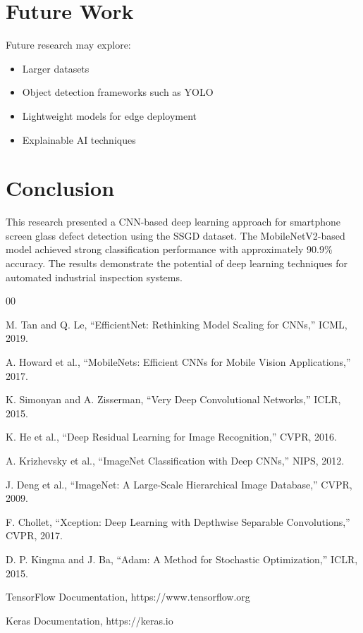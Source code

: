 \documentclass[conference]{IEEEtran}
\begin{document}
\section{Future Work}

Future research may explore:

\begin{itemize}
\item Larger datasets
\item Object detection frameworks such as YOLO
\item Lightweight models for edge deployment
\item Explainable AI techniques
\end{itemize}

\section{Conclusion}

This research presented a CNN-based deep learning approach for smartphone screen glass defect detection using the SSGD dataset. The MobileNetV2-based model achieved strong classification performance with approximately 90.9\% accuracy. The results demonstrate the potential of deep learning techniques for automated industrial inspection systems.

\begin{thebibliography}{00}

 M. Tan and Q. Le, “EfficientNet: Rethinking Model Scaling for CNNs,” ICML, 2019.

 A. Howard et al., “MobileNets: Efficient CNNs for Mobile Vision Applications,” 2017.

 K. Simonyan and A. Zisserman, “Very Deep Convolutional Networks,” ICLR, 2015.

 K. He et al., “Deep Residual Learning for Image Recognition,” CVPR, 2016.

 A. Krizhevsky et al., “ImageNet Classification with Deep CNNs,” NIPS, 2012.

 J. Deng et al., “ImageNet: A Large-Scale Hierarchical Image Database,” CVPR, 2009.

 F. Chollet, “Xception: Deep Learning with Depthwise Separable Convolutions,” CVPR, 2017.

 D. P. Kingma and J. Ba, “Adam: A Method for Stochastic Optimization,” ICLR, 2015.

 TensorFlow Documentation, https://www.tensorflow.org

 Keras Documentation, https://keras.io

\end{thebibliography}
\end{document}
